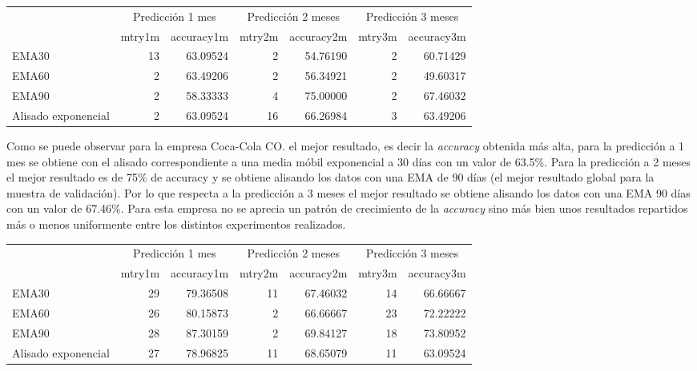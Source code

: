 \documentclass[]{DissertateUSU}
\begin{document}
\begin{table}[H]
\centering\begingroup\fontsize{10}{12}\selectfont

\begin{tabular}{l|r|r|r|r|r|r}
\hline
\multicolumn{1}{c|}{ } & \multicolumn{2}{c|}{Predicción 1 mes} & \multicolumn{2}{c|}{Predicción 2 meses} & \multicolumn{2}{c}{Predicción 3 meses} \\
\cline{2-3} \cline{4-5} \cline{6-7}
  & mtry1m & accuracy1m & mtry2m & accuracy2m & mtry3m & accuracy3m\\
\hline
EMA30 & 13 & 63.09524 & 2 & 54.76190 & 2 & 60.71429\\
\hline
EMA60 & 2 & 63.49206 & 2 & 56.34921 & 2 & 49.60317\\
\hline
EMA90 & 2 & 58.33333 & 4 & 75.00000 & 2 & 67.46032\\
\hline
Alisado exponencial & 2 & 63.09524 & 16 & 66.26984 & 3 & 63.49206\\
\hline
\end{tabular}
\endgroup{}
\end{table}

\setlength\parskip{5ex}

\noindent Como se puede observar para la empresa Coca-Cola CO. el mejor
resultado, es decir la \emph{accuracy} obtenida más alta, para la
predicción a 1 mes se obtiene con el alisado correspondiente a una media
móbil exponencial a 30 días con un valor de 63.5\%. Para la predicción a
2 meses el mejor resultado es de 75\% de accuracy y se obtiene alisando
los datos con una EMA de 90 días (el mejor resultado global para la
muestra de validación). Por lo que respecta a la predicción a 3 meses el
mejor resultado se obtiene alisando los datos con una EMA 90 días con un
valor de 67.46\%. Para esta empresa no se aprecia un patrón de
crecimiento de la \emph{accuracy} sino más bien unos resultados
repartidos más o menos uniformente entre los distintos experimentos
realizados.

\begin{table}[H]
\centering\begingroup\fontsize{10}{12}\selectfont

\begin{tabular}{l|r|r|r|r|r|r}
\hline
\multicolumn{1}{c|}{ } & \multicolumn{2}{c|}{Predicción 1 mes} & \multicolumn{2}{c|}{Predicción 2 meses} & \multicolumn{2}{c}{Predicción 3 meses} \\
\cline{2-3} \cline{4-5} \cline{6-7}
  & mtry1m & accuracy1m & mtry2m & accuracy2m & mtry3m & accuracy3m\\
\hline
EMA30 & 29 & 79.36508 & 11 & 67.46032 & 14 & 66.66667\\
\hline
EMA60 & 26 & 80.15873 & 2 & 66.66667 & 23 & 72.22222\\
\hline
EMA90 & 28 & 87.30159 & 2 & 69.84127 & 18 & 73.80952\\
\hline
Alisado exponencial & 27 & 78.96825 & 11 & 68.65079 & 11 & 63.09524\\
\hline
\end{tabular}
\endgroup{}
\end{table}
\end{document}

